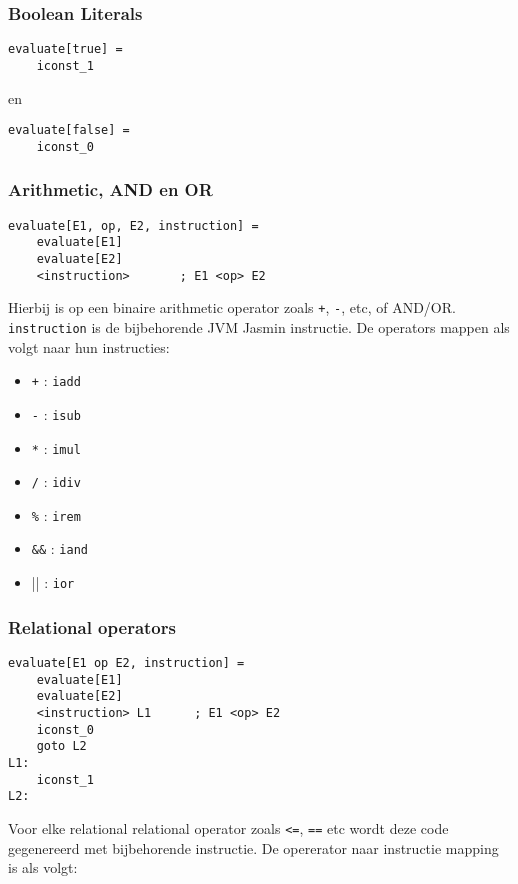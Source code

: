 \documentclass[]{article}
\begin{document}
\subsubsection{Boolean Literals}
\begin{verbatim}
evaluate[true] =
    iconst_1
\end{verbatim}

en

\begin{verbatim}
evaluate[false] =
    iconst_0
\end{verbatim}

\subsubsection{Arithmetic, AND en OR}
\begin{verbatim}
evaluate[E1, op, E2, instruction] =
    evaluate[E1]
    evaluate[E2]
    <instruction>		; E1 <op> E2
\end{verbatim}

Hierbij is op een binaire arithmetic operator zoals \texttt{+}, \texttt{-}, etc, of AND/OR. \texttt{instruction} is de bijbehorende JVM Jasmin instructie. De operators mappen als volgt naar hun instructies:

\begin{itemize}
	\item \texttt{+} : \texttt{iadd}
	\item \texttt{-} : \texttt{isub}
	\item \texttt{*} : \texttt{imul}
	\item \texttt{/} : \texttt{idiv}
	\item \texttt{\%} : \texttt{irem}
	
	\item \texttt{\&\&} : \texttt{iand}
	\item || : \texttt{ior}
\end{itemize}

\subsubsection{Relational operators}

\begin{verbatim}
evaluate[E1 op E2, instruction] =
    evaluate[E1]
    evaluate[E2]
    <instruction> L1	  ; E1 <op> E2
    iconst_0
    goto L2
L1:
    iconst_1
L2:
\end{verbatim}

Voor elke relational relational operator zoals \texttt{\textless=}, \texttt{==} etc wordt deze code gegenereerd met bijbehorende instructie. De opererator naar instructie mapping is als volgt:
\end{document}
